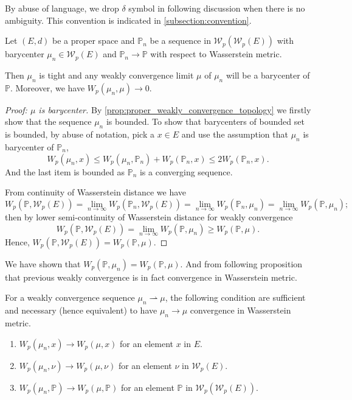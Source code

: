 By abuse of language, we drop $\delta$ symbol in following discussion when there is no ambiguity.
This convention is indicated in \cref{subsection:convention}.
\begin{thm}
	\label{thm:consistency_barycenter_Wasserstein}
	Let $(E,d)$ be a proper space and $\mathbb{P}_n$  be a sequence in $\mathcal{W}_p(\mathcal{W}_p(E))$
	with barycenter $\mu_n \in \mathcal{W}_p(E)$ and $\mathbb{P}_n \rightarrow \mathbb{P}$ with respect to Wasserstein metric.

	Then $\mu_n$ is tight and any weakly convergence limit $\mu$ of $\mu_n$ will be a barycenter of $\mathbb{P}$.
	Moreover, we have $W_p(\mu_n, \mu) \rightarrow 0$.
\end{thm}

\begin{proof}[Proof: $\mu$ is barycenter]
	By \cref{prop:proper_weakly_convergence_topology} we firstly show that the sequence $\mu_n$ is bounded.
	To show that barycenters of bounded set is bounded, by abuse of notation,
	pick a $x \in E$ and use the assumption that $\mu_n$ is barycenter of $\mathbb{P}_n$,
	\[
		W_p(\mu_n, x) \leq W_p(\mu_n, \mathbb{P}_n)  + W_p(\mathbb{P}_n, x) \leq 2 W_p(\mathbb{P}_n , x).
	\]
	And the last item is bounded as $\mathbb{P}_n$ is a converging sequence.

	From continuity of Wasserstein distance we have
	\[
		W_p(\mathbb{P}, \mathcal{W}_p(E)) =
		\lim_{n \rightarrow \infty}W_p(\mathbb{P}_n, \mathcal{W}_p(E))=\lim_{n \rightarrow \infty}W_p(\mathbb{P}_n, \mu_n)
		= \lim_{n \rightarrow \infty}W_p(\mathbb{P}, \mu_n);
	\]
	then by lower semi-continuity of Wasserstein distance for weakly convergence
	\[
		W_p(\mathbb{P}, \mathcal{W}_p(E)) =
		\lim_{n \rightarrow \infty}W_p(\mathbb{P}, \mu_n)
		\geq W_p(\mathbb{P}, \mu).
	\]
	Hence, $W_p(\mathbb{P}, \mathcal{W}_p(E)) =W_p(\mathbb{P}, \mu)$.
\end{proof}

We have shown that $W_p(\mathbb{P}, \mu_n) = W_p(\mathbb{P}, \mu)$.
And from following proposition that previous weakly convergence is in fact convergence in Wasserstein metric.

\begin{prop}
	For a weakly convergence sequence $\mu_n \rightharpoonup \mu$,
	the following condition are sufficient and necessary (hence equivalent) to have $\mu_n \rightarrow \mu$ convergence in Wasserstein metric.
	\begin{enumerate}
		\item $W_p(\mu_n, x) \rightarrow W_p(\mu, x)$ for an element $x$ in $E$.
		\item $W_p(\mu_n, \nu) \rightarrow W_p(\mu, \nu)$ for an element $\nu$ in $\mathcal{W}_p(E)$.
		\item $W_p(\mu_n, \mathbb{P}) \rightarrow W_p(\mu, \mathbb{P})$ for an element $\mathbb{P}$ in $\mathcal{W}_p(\mathcal{W}_p(E))$.
	\end{enumerate}
\end{prop}


